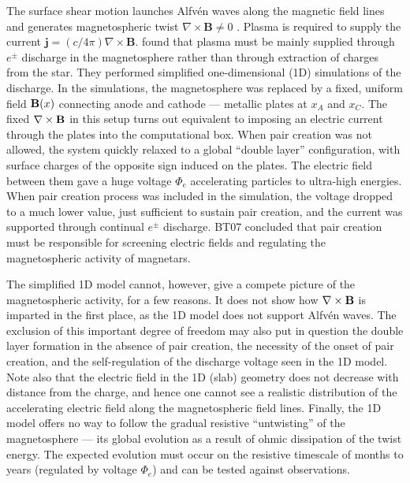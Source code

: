 The surface shear motion launches Alfv\'en waves along the magnetic field lines and
generates magnetospheric twist $\nabla\times \mathbf{B} \neq 0$
\citetext{\citealp{thompson_electrodynamics_2002}; \citealp{parfrey_dynamics_2013},
  hereafter PBH13}.
Plasma is required to supply the current $\mathbf{j} = (c/4\pi)\nabla\times \mathbf{B}$.
\citet[hereafter BT07]{beloborodov_corona_2007}
found that plasma must be mainly supplied through $e^\pm$ discharge in the
magnetosphere rather than through extraction of charges from the star.
They performed simplified one-dimensional (1D) simulations of the discharge.
In the simulations, the magnetosphere was replaced by
a fixed, uniform field ${\mathbf B}(x)$ connecting anode and cathode ---
metallic plates at $x_A$ and $x_C$. The fixed $\nabla\times{\mathbf B}$ in this
setup turns out equivalent to imposing an electric current through the plates into
the computational box.
When pair creation was not allowed, the system quickly relaxed to a global
``double layer'' configuration, with surface charges of the opposite sign induced on the plates.
The electric field between them gave a huge voltage $\Phi_e$ accelerating
particles to ultra-high energies. When pair creation process was included in the simulation,
the voltage dropped to a much lower value, just sufficient to sustain pair creation,
and the current was supported through continual $e^\pm$ discharge.
BT07 concluded that pair creation must be responsible for screening
electric fields and regulating the magnetospheric activity of magnetars.

The simplified 1D model cannot, however, give a compete picture of the
magnetospheric activity, for a few reasons. It does not show how
$\nabla\times{\mathbf B}$ is imparted in the first place, as the 1D model does not
support Alfv\'en waves. The exclusion of this important degree of freedom may
also put in question the double layer formation in the absence of pair creation,
the necessity of the onset of pair creation, and the self-regulation of the
discharge voltage seen in the 1D model. Note also that the electric field in the
1D (slab) geometry does not decrease with distance from the charge, and hence
one cannot see a realistic distribution of the accelerating electric field along
the magnetospheric field lines. Finally, the 1D model offers no way to follow
the gradual resistive ``untwisting'' of the magnetosphere --- its global
evolution as a result of ohmic dissipation of the twist energy. The expected
evolution must occur on the resistive timescale of months to years (regulated by
voltage $\Phi_e$) and can be tested against observations.

